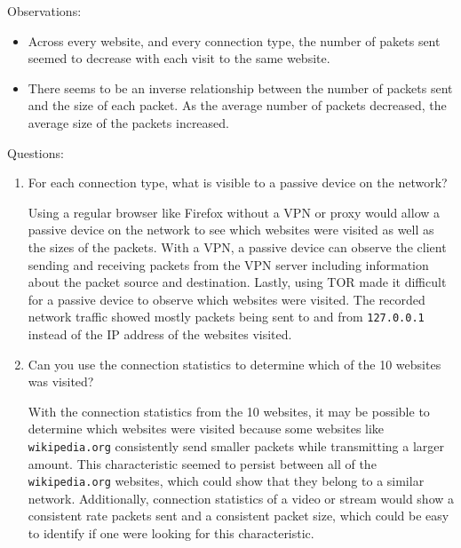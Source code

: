 \documentclass[11pt]{article}
\begin{document}
\noindent Observations:
\begin{itemize}
    \item Across every website, and every connection type, the number of pakets sent seemed to decrease with each visit to the same website.
    \item There seems to be an inverse relationship between the number of packets sent and the size of each packet.
    As the average number of packets decreased, the average size of the packets increased.
\end{itemize}

\noindent Questions:
\begin{enumerate}
  \item For each connection type, what is visible to a passive device on the network?

  Using a regular browser like Firefox without a VPN or proxy would allow a passive device on the network to
  see which websites were visited as well as the sizes of the packets. With a VPN, a passive device can
  observe the client sending and receiving packets from the VPN server including information about the packet source and destination.
  Lastly, using TOR made it difficult for a passive device to observe which websites were visited.
  The recorded network traffic showed mostly packets being sent to and from \verb|127.0.0.1|
  instead of the IP address of the websites visited.

  \item Can you use the connection statistics to determine which of the 10 websites was visited?

  With the connection statistics from the 10 websites, it may be possible to determine which websites were visited
  because some websites like \verb|wikipedia.org| consistently send smaller packets while transmitting a larger amount.
  This characteristic seemed to persist between all of the \verb|wikipedia.org| websites, which could show that they belong to a similar network.
  Additionally, connection statistics of a video or stream would show a consistent rate packets sent and a consistent packet
  size, which could be easy to identify if one were looking for this characteristic.
\end{enumerate}
\end{document}
